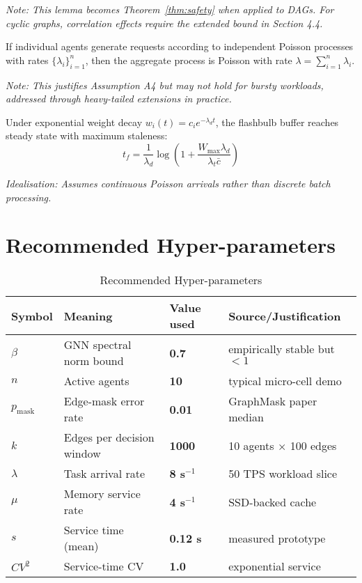 \documentclass{article}
\begin{document}
\textit{Note: This lemma becomes Theorem~\ref{thm:safety} when applied to DAGs. For cyclic graphs, correlation effects require the extended bound in Section 4.4.}

\begin{lemma}
\label{lem:poisson}
If individual agents generate requests according to independent Poisson processes with rates $\{\lambda_i\}_{i=1}^n$, then the aggregate process is Poisson with rate $\lambda = \sum_{i=1}^n \lambda_i$.
\end{lemma}

\textit{Note: This justifies Assumption A4 but may not hold for bursty workloads, addressed through heavy-tailed extensions in practice.}

\begin{lemma}
\label{lem:memory_decay}
Under exponential weight decay $w_i(t) = c_i e^{-\lambda_d t}$, the flashbulb buffer reaches steady state with maximum staleness:
$$t_f = \frac{1}{\lambda_d} \log\left(1 + \frac{W_{\max}\lambda_d}{\lambda_t\bar{c}}\right)$$
\end{lemma}

\textit{Idealisation: Assumes continuous Poisson arrivals rather than discrete batch processing.}

\section{Recommended Hyper-parameters}
\label{app:parameters}

\begin{table}[h!]
\centering
\caption{Recommended Hyper-parameters}
\label{tab:hyperparams}
\begin{tabular}{|l|l|l|l|}
\hline
\textbf{Symbol} & \textbf{Meaning} & \textbf{Value used} & \textbf{Source/Justification} \\
\hline
$\beta$ & GNN spectral norm bound & \textbf{0.7} & empirically stable but $< 1$ \\
\hline
$n$ & Active agents & \textbf{10} & typical micro-cell demo \\
\hline
$p_{\text{mask}}$ & Edge-mask error rate & \textbf{0.01} & GraphMask paper median \\
\hline
$k$ & Edges per decision window & \textbf{1000} & 10 agents × 100 edges \\
\hline
$\lambda$ & Task arrival rate & \textbf{8 s$^{-1}$} & 50 TPS workload slice \\
\hline
$\mu$ & Memory service rate & \textbf{4 s$^{-1}$} & SSD-backed cache \\
\hline
$s$ & Service time (mean) & \textbf{0.12 s} & measured prototype \\
\hline
$CV^2$ & Service-time CV & \textbf{1.0} & exponential service \\
\hline
\end{tabular}
\end{table}
\end{document}
